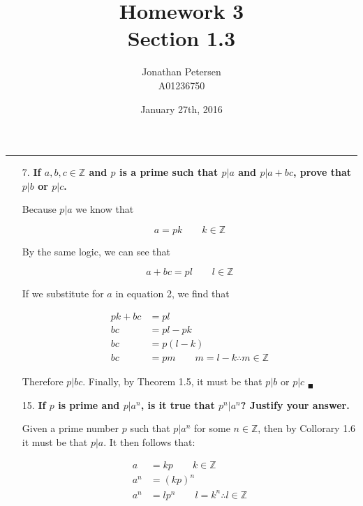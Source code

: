 \documentclass{article}
\title{Homework 3 \\ Section 1.3}
\author{Jonathan Petersen \\ A01236750}
\date{January 27th, 2016}
\begin{document}
	\maketitle
	\hrule
	\begin{enumerate}
		\item[7.]	\textbf{If $a, b, c \in \mathbb{Z}$ and $p$ is a prime such that $p | a$ and
					$p | a + bc$, prove that $p | b$ or $p | c$.}

					Because $p | a$ we know that 

					\begin{equation}
						a = pk \qquad k \in \mathbb{Z}				
					\end{equation}

					By the same logic, we can see that 

					\begin{equation}
						a + bc = pl \qquad l \in \mathbb{Z}
					\end{equation}

					If we substitute for $a$ in equation 2, we find that

					\begin{align*}
						pk + bc &= pl \\
						bc &= pl - pk \\
						bc &= p(l - k) \\
						bc &= pm \qquad m = l - k \therefore m \in \mathbb{Z}
					\end{align*}

					Therefore $p | bc$. Finally, by Theorem 1.5, it must be that $p | b$ or $p | c$ 
					$_{\blacksquare}$

		\item[15.]	\textbf{If $p$ is prime and $p | a^n$, is it true that $p^n | a^n$? Justify your 
					answer.}

					Given a prime number $p$ such that $p | a^n$ for some $n \in \mathbb{Z}$, then 
					by Collorary 1.6 it must be that $p | a$. It then follows that:

					\begin{align*}
						a &= kp \qquad k \in \mathbb{Z} \\
						a^n &= (kp)^n \\
						a^n &= lp^n \qquad l = k^n \therefore l \in \mathbb{Z} \\
					\end{align*}


\end{enumerate}
\end{document}
